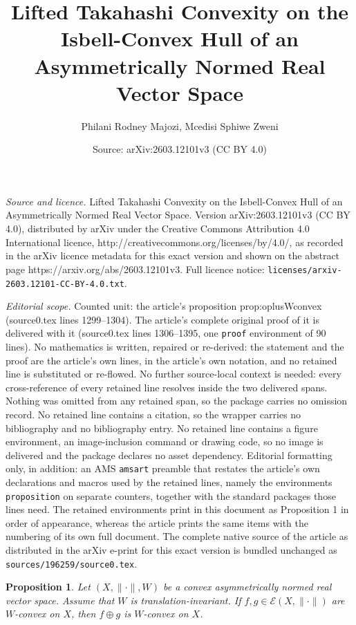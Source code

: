 \documentclass[10pt,a4paper]{amsart}
\title{Lifted Takahashi Convexity on the Isbell-Convex Hull of an Asymmetrically Normed Real Vector Space}
\author{Philani Rodney Majozi, Mcedisi Sphiwe Zweni}
\date{Source: arXiv:2603.12101v3 (CC BY 4.0)}
\newtheorem{proposition}{Proposition}
\newcommand{\E}{\mathcal{E}}
\begin{document}
\maketitle

\noindent\emph{Source and licence.} Lifted Takahashi Convexity on the Isbell-Convex Hull of an Asymmetrically Normed Real Vector Space. Version arXiv:2603.12101v3 (CC BY 4.0), distributed by arXiv under the Creative Commons Attribution 4.0 International licence, http://creativecommons.org/licenses/by/4.0/, as recorded in the arXiv licence metadata for this exact version and shown on the abstract page https://arxiv.org/abs/2603.12101v3. Full licence notice: \texttt{licenses/arxiv-2603.12101-CC-BY-4.0.txt}.\par\smallskip

\noindent\textit{Editorial scope.} Counted unit: the article's proposition prop:oplusWconvex (source0.tex lines 1299--1304). The article's complete original proof of it is delivered with it (source0.tex lines 1306--1395, one \texttt{proof} environment of 90 lines). No mathematics is written, repaired or re-derived: the statement and the proof are the article's own lines, in the article's own notation, and no retained line is substituted or re-flowed.  No further source-local context is needed: every cross-reference of every retained line resolves inside the two delivered spans.  Nothing was omitted from any retained span, so the package carries no omission record.  No retained line contains a citation, so the wrapper carries no bibliography and no bibliography entry.  No retained line contains a figure environment, an image-inclusion command or drawing code, so no image is delivered and the package declares no asset dependency.  Editorial formatting only, in addition: an AMS \texttt{amsart} preamble that restates the article's own declarations and macros used by the retained lines, namely the environments \texttt{proposition} on separate counters, together with the standard packages those lines need.  The retained environments print in this document as Proposition 1 in order of appearance, whereas the article prints the same items with the numbering of its own full document.  The complete native source of the article as distributed in the arXiv e-print for this exact version is bundled unchanged as \texttt{sources/196259/source0.tex}.
\begin{proposition}\label{prop:oplusWconvex}
Let \((X,\|\cdot\|,W)\) be a convex asymmetrically normed real vector space.
Assume that \(W\) is translation-invariant.  If
\(f,g\in\E(X,\|\cdot\|)\) are \(W\)-convex on \(X\), then
\(f\oplus g\) is \(W\)-convex on \(X\).
\end{proposition}
\end{document}
